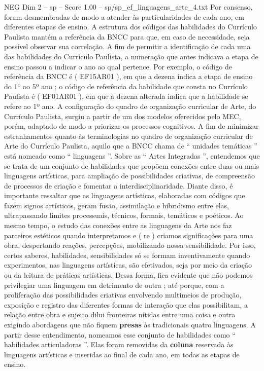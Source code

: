 \begin{textsample}{NEG Dim 2 – sp – Score 1.00 – sp/sp\_ef\_linguagens\_arte\_4.txt}
Por consenso, foram desmembradas de modo a atender às particularidades de cada ano, em diferentes etapas de ensino.
A estrutura dos códigos das habilidades do Currículo Paulista mantém a referência da BNCC para que, em caso de necessidade, seja possível observar sua correlação.
A fim de permitir a identificação de cada uma das habilidades do Currículo Paulista, a numeração que antes indicava a etapa de ensino passou a indicar o ano ao qual pertence.
Por exemplo, o código de referência da BNCC é ( EF15AR01 ), em que a dezena indica a etapa de ensino do 1º ao 5º ano ; o código de referência da habilidade que consta no Currículo Paulista é ( EF01AR01 ), em que a dezena alterada indica que a habilidade se refere ao 1º ano.
A configuração do quadro de organização curricular de Arte, do Currículo Paulista, surgiu a partir de um dos modelos oferecidos pelo MEC, porém, adaptado de modo a priorizar os processos cognitivos.
A fim de minimizar estranhamentos quanto às terminologias no quadro de organização curricular de Arte do Currículo Paulista, aquilo que a BNCC chama de “ unidades temáticas ” está nomeado como “ linguagens ”.
Sobre as “ Artes Integradas ”, entendemos que se trata de um conjunto de habilidades que propõem conexões entre duas ou mais linguagens artísticas, para ampliação de possibilidades criativas, de compreensão de processos de criação e fomentar a interdisciplinaridade.
Diante disso, é importante ressaltar que as linguagens artísticas, elaboradas com códigos que fazem signos artísticos, geram fusão, assimilação e hibridismo entre elas, ultrapassando limites processuais, técnicos, formais, temáticos e poéticos.
Ao mesmo tempo, o estudo das conexões entre as linguagens da Arte nos faz parceiros estéticos quando interpretamos e ( re ) criamos significações para uma obra, despertando reações, percepções, mobilizando nossa sensibilidade.
Por isso, certos saberes, habilidades, sensibilidades só se formam inventivamente quando experimentos, nas linguagens artísticas, são efetivados, seja por meio da criação ou da leitura de práticas artísticas.
Dessa forma, fica evidente que não podemos privilegiar uma linguagem em detrimento de outra ; até porque, com a proliferação das possibilidades criativas envolvendo multimeios de produção, exposição e registro das diferentes formas de interação que elas possibilitam, a relação entre obra e sujeito dilui fronteiras nítidas entre uma coisa e outra exigindo abordagens que não fiquem \textbf{presas} às tradicionais quatro linguagens.
A partir desse entendimento, nomeamos esse conjunto de habilidades como “ habilidades articuladoras ”.
Elas foram removidas da \textbf{coluna} reservada às linguagens artísticas e inseridas ao final de cada ano, em todas as etapas de ensino.

\end{textsample}
